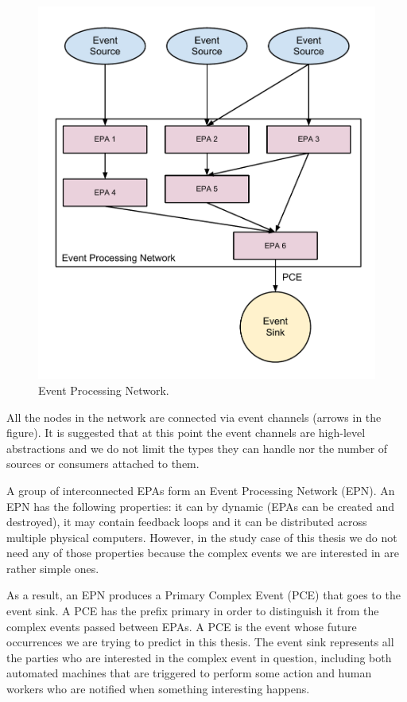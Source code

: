 \begin{figure}[here]
\centering
\includegraphics[scale=0.7]{images/event_processing_system.pdf}
\caption{Event Processing Network.}
\label{fig:event_processing_network}
\end{figure}

All the nodes in the network are connected via event channels (arrows in the figure). It is suggested that at this point the event channels are high-level abstractions and we do not limit the types they can handle nor the number of sources or consumers attached to them. \cite{IBM10}

A group of interconnected EPAs form an Event Processing Network (EPN). An EPN has the following properties: it can by dynamic (EPAs can be created and destroyed), it may contain feedback loops and it can be distributed across multiple physical computers. \cite{Luckham08} However, in the study case of this thesis we do not need any of those properties because the complex events we are interested in are rather simple ones.

As a result, an EPN produces a Primary Complex Event (PCE) that goes to the event sink. A PCE has the prefix primary in order to distinguish it from the complex events passed between EPAs. A PCE is the event whose future occurrences we are trying to predict in this thesis. The event sink represents all the parties who are interested in the complex event in question, including both automated machines that are triggered to perform some action and human workers who are notified when something interesting happens. \cite{Fulop12}


